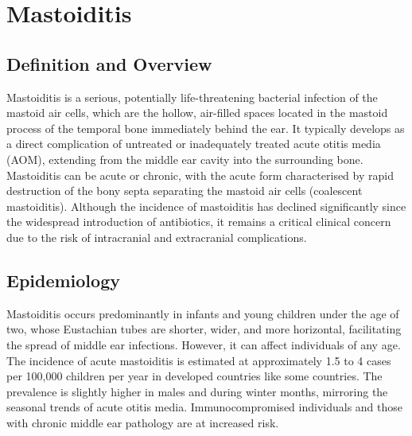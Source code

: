\chapter{Mastoiditis}

\section*{Definition and Overview}
Mastoiditis is a serious, potentially life-threatening bacterial infection of the mastoid air cells, which are the hollow, air-filled spaces located in the mastoid process of the temporal bone immediately behind the ear. It typically develops as a direct complication of untreated or inadequately treated acute otitis media (AOM), extending from the middle ear cavity into the surrounding bone. Mastoiditis can be acute or chronic, with the acute form characterised by rapid destruction of the bony septa separating the mastoid air cells (coalescent mastoiditis). Although the incidence of mastoiditis has declined significantly since the widespread introduction of antibiotics, it remains a critical clinical concern due to the risk of intracranial and extracranial complications.

\section*{Epidemiology}
Mastoiditis occurs predominantly in infants and young children under the age of two, whose Eustachian tubes are shorter, wider, and more horizontal, facilitating the spread of middle ear infections. However, it can affect individuals of any age. The incidence of acute mastoiditis is estimated at approximately 1.5 to 4 cases per 100,000 children per year in developed countries like some countries. The prevalence is slightly higher in males and during winter months, mirroring the seasonal trends of acute otitis media. Immunocompromised individuals and those with chronic middle ear pathology are at increased risk.

